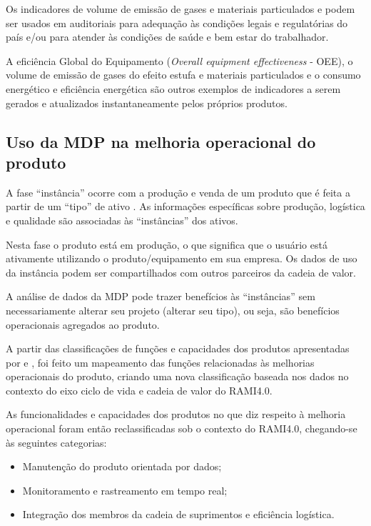 Os indicadores de  volume de emissão de gases e materiais particulados e podem ser usados em auditoriais para adequação às condições legais e regulatórias do país e/ou para atender às condições de saúde e bem estar do trabalhador.

A eficiência Global do Equipamento (\textit{Overall equipment effectiveness} - OEE), o volume de emissão de gases do efeito estufa e materiais particulados e o consumo energético e eficiência energética são outros exemplos de indicadores a serem gerados e atualizados instantaneamente pelos próprios produtos.

\subsection{Uso da MDP na melhoria operacional do produto}
\label{sec:melhoria-operacional}

A fase ``instância'' ocorre com a produção e venda de um produto que é feita a partir de um ``tipo'' de ativo \cite{bader2019aas}. As informações específicas sobre produção, logística e qualidade são associadas às ``instâncias'' dos ativos.

Nesta fase o produto está em produção, o que significa que o usuário está ativamente utilizando o produto/equipamento em sua empresa. Os dados de uso da instância podem ser compartilhados com outros parceiros da cadeia de valor.

A análise de dados da MDP pode trazer benefícios às ``instâncias'' sem necessariamente alterar seu projeto (alterar seu tipo), ou seja, são benefícios operacionais agregados ao produto.

A partir das classificações de funções e capacidades dos produtos apresentadas por  e , foi feito um mapeamento das funções relacionadas às melhorias operacionais do produto, criando uma nova classificação baseada nos dados no contexto do eixo ciclo de vida e cadeia de valor do RAMI4.0.

As funcionalidades e capacidades dos produtos no que diz respeito à melhoria operacional foram então reclassificadas sob o contexto do RAMI4.0, chegando-se às seguintes categorias:

\begin{itemize}
	\item Manutenção do produto orientada por dados;
	\item Monitoramento e rastreamento em tempo real;
	\item Integração dos membros da cadeia de suprimentos e eficiência logística.
\end{itemize}

